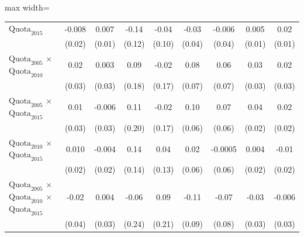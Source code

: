\begin{table}[htbp]
\begin{adjustbox}{max width=\linewidth}
\begin{threeparttable}[b]
\begin{tabular}{lcccccccc}
            $\text{Quota}_{2015}$                                                                    & -0.008       & 0.007         & -0.14        & -0.04         & -0.03        & -0.006        & 0.005        & 0.02\\   
                                                                                                     & (0.02)       & (0.01)        & (0.12)       & (0.10)        & (0.04)       & (0.04)        & (0.01)       & (0.01)\\   
            $\text{Quota}_{2005}$ $\times$ $\text{Quota}_{2010}$                                     & 0.02         & 0.003         & 0.09         & -0.02         & 0.08         & 0.06          & 0.03         & 0.02\\   
                                                                                                     & (0.03)       & (0.03)        & (0.18)       & (0.17)        & (0.07)       & (0.07)        & (0.03)       & (0.03)\\   
            $\text{Quota}_{2005}$ $\times$ $\text{Quota}_{2015}$                                     & 0.01         & -0.006        & 0.11         & -0.02         & 0.10         & 0.07          & 0.04         & 0.02\\   
                                                                                                     & (0.03)       & (0.03)        & (0.20)       & (0.17)        & (0.06)       & (0.06)        & (0.02)       & (0.02)\\   
            $\text{Quota}_{2010}$ $\times$ $\text{Quota}_{2015}$                                     & 0.010        & -0.004        & 0.14         & 0.04          & 0.02         & -0.0005       & 0.004        & -0.01\\   
                                                                                                     & (0.02)       & (0.02)        & (0.14)       & (0.13)        & (0.06)       & (0.06)        & (0.02)       & (0.02)\\   
            $\text{Quota}_{2005}$ $\times$ $\text{Quota}_{2010}$ $\times$ $\text{Quota}_{2015}$      & -0.02        & 0.004         & -0.06        & 0.09          & -0.11        & -0.07         & -0.03        & -0.006\\   
                                                                                                     & (0.04)       & (0.03)        & (0.24)       & (0.21)        & (0.09)       & (0.08)        & (0.03)       & (0.03)\\   

\end{tabular}
\end{threeparttable}
\end{adjustbox}
\end{table}
